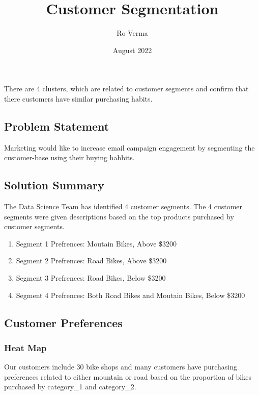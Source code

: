 \documentclass[
]{article}
\title{Customer Segmentation}
\author{Ro Verma}
\date{August 2022}
\begin{document}
\maketitle

There are 4 clusters, which are related to customer segments and confirm
that there customers have similar purchasing habits.

\hypertarget{problem-statement}{%
\subsection{Problem Statement}\label{problem-statement}}

Marketing would like to increase email campaign engagement by segmenting
the customer-base using their buying habbits.

\hypertarget{solution-summary}{%
\subsection{Solution Summary}\label{solution-summary}}

The Data Science Team has identified 4 customer segments. The 4 customer
segments were given descriptions based on the top products purchased by
customer segments.

\begin{enumerate}
\def\labelenumi{\arabic{enumi}.}
\item
  Segment 1 Prefrences: Moutain Bikes, Above \$3200
\item
  Segment 2 Prefrences: Road Bikes, Above \$3200
\item
  Segment 3 Prefrences: Road Bikes, Below \$3200
\item
  Segment 4 Prefrences: Both Road Bikes and Moutain Bikes, Below \$3200
\end{enumerate}

\hypertarget{customer-preferences}{%
\subsection{Customer Preferences}\label{customer-preferences}}

\hypertarget{heat-map}{%
\subsubsection{Heat Map}\label{heat-map}}

Our customers include 30 bike shops and many customers have purchasing
preferences related to either mountain or road based on the proportion
of bikes purchased by category\_1 and category\_2.
\end{document}
